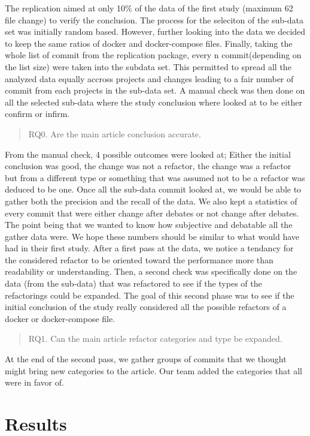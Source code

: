 \documentclass[lettersize,journal]{IEEEtran}
\begin{document}
The replication aimed at only 10\% of the data of the first study (maximum 62 file change) to verify the conclusion.
The process for the seleciton of the sub-data set was initially random based. 
However, further looking into the data we decided to keep the same ratios of docker and docker-compose files.
Finally, taking the whole list of commit from the replication package, every n commit(depending on the list size) were taken into the subdata set.
This permitted to spread all the analyzed data equally accross projects and changes leading to a fair number of commit from each projects in the sub-data set.
A manual check was then done on all the selected sub-data where the study conclusion where looked at to be either confirm or infirm.
\begin{quote}
        RQ0. Are the main article conclusion accurate.
\end{quote}
From the manual check, 4 possible outcomes were looked at;
Either the initial conclusion was good, the change was not a refactor, the change was a refactor but from a different type or something that was assumed not to be a refactor was deduced to be one.
Once all the sub-data commit looked at, we would be able to gather both the precision and the recall of the data.
We also kept a statistics of every commit that were either change after debates or not change after debates.
The point being that we wanted to know how subjective and debatable all the gather data were.
We hope these numbers should be similar to what \cite{1} would have had in their first study.
After a first pass at the data, we notice a tendancy for the considered refactor to be oriented toward the performance more than readability or understanding. 
Then, a second check was specifically done on the data (from the sub-data) that was refactored to see if the types of the refactorings could be expanded.
The goal of this second phase was to see if the initial conclusion of the study really considered all the possible refactors of a docker or docker-compose file.
\begin{quote}
        RQ1. Can the main article refactor categories and type be expanded.
\end{quote}
At the end of the second pass, we gather groups of commits that we thought might bring new categories to the article.
Our team added the categories that all were in favor of.

\section{Results}
\end{document}
